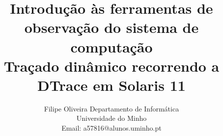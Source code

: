 \documentclass[a4paper]{article}
\begin{document}
\title{Introdução às ferramentas de observação do sistema de computação\\ Traçado dinâmico recorrendo a DTrace em Solaris 11}

\author{
{Filipe Oliveira}
  Departamento de Informática\\
    Universidade do Minho\\
    Email: a57816@alunos.uminho.pt}
    



\maketitle







%





  \renewcommand{\abstract}{\textbf{\centering Introdução -- Contextualização da Ferramenta DTrace\break}}
\end{document}
